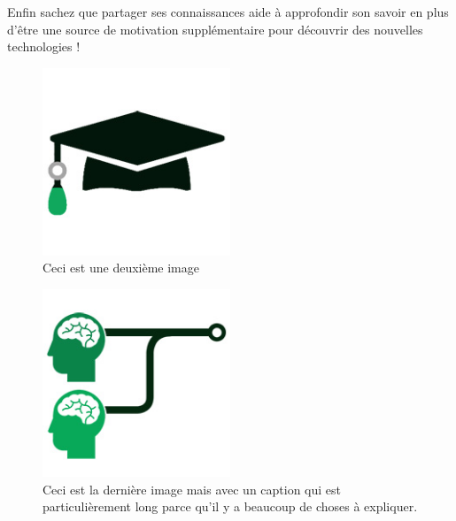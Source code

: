 \documentclass[a4paper,11pt]{article}
\begin{document}
Enfin sachez que partager ses connaissances aide à approfondir son savoir en plus d'être une source de motivation supplémentaire pour découvrir des nouvelles technologies !  

\begin{figure}[!h]
\begin{center}
\includegraphics[width=0.5\textwidth]{./image2.jpg}
\caption{Ceci est une deuxième image}
\label{image2}
\end{center}
\end{figure}


\begin{figure}[!h]
\begin{center}
\includegraphics[width=0.5\textwidth]{./image3.jpg}
\caption[Logo avec des cerveaux]{Ceci est la dernière image mais avec un caption qui est particulièrement long parce qu'il y a beaucoup de choses à expliquer.}
\label{image3}
\end{center}
\end{figure}
\end{document}
